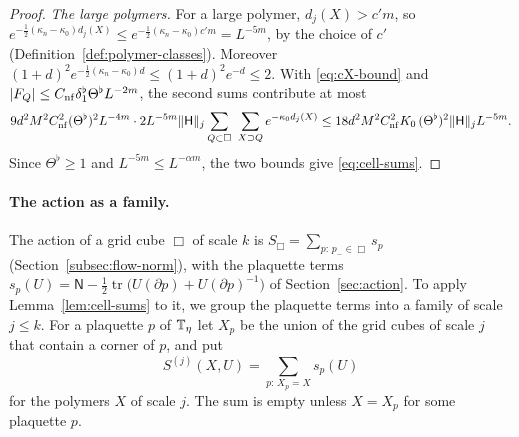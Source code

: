 \begin{proof}
\emph{The large polymers.} For a large polymer, $d_j(X)>c'm$, so $e^{-\frac12(\kappa_n-\kappa_0)d_j(X)}\le e^{-\frac12(\kappa_n-\kappa_0)c'm}=L^{-5m}$, by the choice of $c'$ (Definition~\ref{def:polymer-classes}). Moreover $(1+d)^2e^{-\frac12(\kappa_n-\kappa_0)d}\le(1+d)^2e^{-d}\le2$. With \eqref{eq:cX-bound} and $|F_Q|\le C_{\rm nf}\delta_1^\flat\Theta^\flat L^{-2m}$, the second sums contribute at most
\[
9d^2M^2C_{\rm nf}^2(\Theta^\flat)^2L^{-4m}\cdot2L^{-5m}\|\mathsf H\|_j\sum_{Q\subset\Box}\ \sum_{X\supset Q}e^{-\kappa_0d_j(X)}\le18d^2M^2C_{\rm nf}^2K_0\,(\Theta^\flat)^2\|\mathsf H\|_jL^{-5m}.
\]
Since $\Theta^\flat\ge1$ and $L^{-5m}\le L^{-\alpha m}$, the two bounds give \eqref{eq:cell-sums}.
\end{proof}

\paragraph{The action as a family.} The action of a grid cube $\Box$ of scale $k$ is $S_\Box=\sum_{p:\,p_-\in\Box}s_p$ (Section~\ref{subsec:flow-norm}), with the plaquette terms $s_p(U)=\mathsf N-\frac12\operatorname{tr}\big(U(\partial p)+U(\partial p)^{-1}\big)$ of Section~\ref{sec:action}. To apply Lemma~\ref{lem:cell-sums} to it, we group the plaquette terms into a family of scale $j\le k$. For a plaquette $p$ of $\mathbb T_\eta$ let $X_p$ be the union of the grid cubes of scale $j$ that contain a corner of $p$, and put
\[
S^{(j)}(X,U)=\sum_{p:\,X_p=X}s_p(U)
\]
for the polymers $X$ of scale $j$. The sum is empty unless $X=X_p$ for some plaquette $p$.

